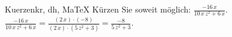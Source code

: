 \begin{MAufgabe}{Kuerzen}{kr, dh, MaTeX}
K\"urzen Sie soweit m\"oglich: $\frac{- 16\, x}{10\, x\, z^2 + 6\, x}$.\\ 
\ifLsg\MLoesung
\quad $\frac{- 16\, x}{10\, x\, z^2 + 6\, x}=\frac{(2\, x)\cdot(-8)}{(2\, x)\cdot(5\, z^2 + 3)}=\frac{-8}{5\, z^2 + 3}$.\else\relax\fi
 \end{MAufgabe}